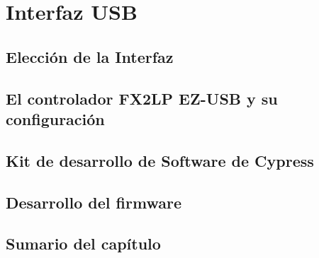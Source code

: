 \chapter{Interfaz USB}
	
	\label{cap:cy}
	\section{Elección de la Interfaz}
		
	\section{El controlador FX2LP EZ-USB y su configuración}
		
	\section{Kit de desarrollo de Software de Cypress}
		
	\section{Desarrollo del firmware}
		
	\section{Sumario del capítulo}
		